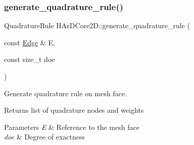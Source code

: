 \subsubsection{\texorpdfstring{generate\+\_\+quadrature\+\_\+rule()}{generate\_quadrature\_rule()}\hspace{0.1cm}{\footnotesize\ttfamily [2/2]}}
{\footnotesize\ttfamily Quadrature\+Rule H\+Ar\+D\+Core2\+D\+::generate\+\_\+quadrature\+\_\+rule (\begin{DoxyParamCaption}\item[{const \hyperlink{classHArDCore2D_1_1Edge}{Edge} \&}]{E,  }\item[{const size\+\_\+t}]{doe }\end{DoxyParamCaption})}



Generate quadrature rule on mesh face. 

\begin{DoxyReturn}{Returns}
list of quadrature nodes and weights 
\end{DoxyReturn}

\begin{DoxyParams}{Parameters}
{\em E} & Reference to the mesh face \\
\hline
{\em doe} & Degree of exactness \\
\hline
\end{DoxyParams}
